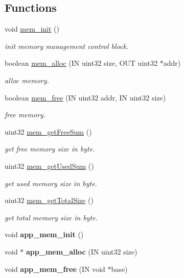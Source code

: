 \subsection*{Functions}
\begin{DoxyCompactItemize}
\item 
void \hyperlink{group__mem_ga9ce51c33e96ef646614c4c93f271e316}{mem\+\_\+init} ()
\begin{DoxyCompactList}\small\item\em init memory management control block. \end{DoxyCompactList}\item 
boolean \hyperlink{group__mem_ga7371db44cf8d20ebc39503cfb1fbcdfd}{mem\+\_\+alloc} (I\+N uint32 size, O\+U\+T uint32 $\ast$addr)
\begin{DoxyCompactList}\small\item\em alloc memory. \end{DoxyCompactList}\item 
boolean \hyperlink{group__mem_ga200c6b0001f8db0ed5705b2a20bf78c3}{mem\+\_\+free} (I\+N uint32 addr, I\+N uint32 size)
\begin{DoxyCompactList}\small\item\em free memory. \end{DoxyCompactList}\item 
uint32 \hyperlink{group__mem_ga40f09bfdd3312ed69f024ce8bea4b877}{mem\+\_\+get\+Free\+Sum} ()
\begin{DoxyCompactList}\small\item\em get free memory size in byte. \end{DoxyCompactList}\item 
uint32 \hyperlink{group__mem_gaf7f167858e1eb2aaf0b907a50c97e7e5}{mem\+\_\+get\+Used\+Sum} ()
\begin{DoxyCompactList}\small\item\em get used memory size in byte. \end{DoxyCompactList}\item 
uint32 \hyperlink{group__mem_gad8ee11b35e90d2427dc04293342cc0fb}{mem\+\_\+get\+Total\+Size} ()
\begin{DoxyCompactList}\small\item\em get total memory size in byte. \end{DoxyCompactList}\item 
\hypertarget{group__mem_ga0285f6b0d2098a2a6758acadf22a0456}{}void {\bfseries app\+\_\+mem\+\_\+init} ()\label{group__mem_ga0285f6b0d2098a2a6758acadf22a0456}

\item 
\hypertarget{group__mem_gaeea4bdecb7aca7074e0b9efc295c27d3}{}void $\ast$ {\bfseries app\+\_\+mem\+\_\+alloc} (I\+N uint32 size)\label{group__mem_gaeea4bdecb7aca7074e0b9efc295c27d3}

\item 
\hypertarget{group__mem_ga417ed8e8e9bc27f8ce6b644efa391025}{}void {\bfseries app\+\_\+mem\+\_\+free} (I\+N void $\ast$base)\label{group__mem_ga417ed8e8e9bc27f8ce6b644efa391025}

\end{DoxyCompactItemize}


